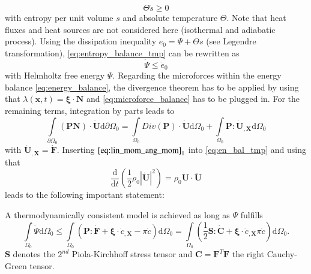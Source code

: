 \begin{equation} \label{eq:entropy_balance_tmp}
	\Theta\dot{s}\geq0
\end{equation}
with entropy per unit volume $s$ and absolute temperature $\Theta$. Note that heat fluxes and heat sources are not considered here (isothermal and adiabatic process). Using the dissipation inequality $e_{0}=\Psi+\Theta  s$ (see Legendre transformation), \eqref{eq:entropy_balance_tmp} can be rewritten as
\begin{equation} \label{eq:entropy_balance}
	\dot{\Psi}\leq\dot{e}_{0}
\end{equation}
with Helmholtz free energy $\Psi$. Regarding the microforces within the energy balance \eqref{eq:energy_balance}, the divergence theorem has to be applied by using that $\lambda\left(\mathbf{x},t\right)=\bm{\xi}\cdot\mathbf{N}$ and \eqref{eq:microforce_balance} has to be plugged in. For the remaining terms, integration by parts leads to 
\begin{equation} \label{eq:en_bal_tmp}
	\int\limits_{\partial\Omega_{0}}\left(\mathbf{P}\mathbf{N}\right)\cdot\dot{\mathbf{U}}\mathrm{d}\partial\Omega_{0}=\int\limits_{\Omega_{0}}Div\left(\mathbf{P}\right)\cdot\dot{\mathbf{U}}\mathrm{d}\Omega_{0}+\int\limits_{\Omega_{0}}\mathbf{P}:\dot{\mathbf{U}}_{,\mathbf{X}}\mathrm{d}\Omega_{0}
\end{equation}
with $\dot{\mathbf{U}}_{,\mathbf{X}}=\dot{\mathbf{F}}$. Inserting $\eqref{eq:lin_mom_ang_mom}_{1}$ into \eqref{eq:en_bal_tmp} and using that
\begin{equation}
	\dfrac{\mathrm{d}}{\mathrm{d}t}\left(\dfrac{1}{2}\rho_{0}|\dot{\mathbf{U}}|^{2}\right) = \rho_{0}\dot{\mathbf{U}}\cdot\ddot{\mathbf{U}}
\end{equation}
leads to the following important statement:

A thermodynamically consistent model is achieved as long as $\Psi$ fulfills
\begin{equation} \label{eq:thermodyn_cons}
		\int\limits_{\Omega_{0}}\dot{\Psi}\mathrm{d}\Omega_{0} \leq \int\limits_{\Omega_{0}}\left(\mathbf{P}:\dot{\mathbf{F}}+\bm{\xi}\cdot\dot{c}_{,\mathbf{X}}-\pi\dot{c}\right)\mathrm{d}\Omega_{0} = \int\limits_{\Omega_{0}}\left(\dfrac{1}{2}\mathbf{S}:\dot{\mathbf{C}}+\bm{\xi}\cdot\dot{c}_{,\mathbf{X}}\pi\dot{c}\right)\mathrm{d}\Omega_{0}.
\end{equation}
$\mathbf{S}$ denotes the $2^{nd}$ Piola-Kirchhoff stress tensor and $\mathbf{C}=\mathbf{F}^{T}\mathbf{F}$ the right Cauchy-Green tensor.

